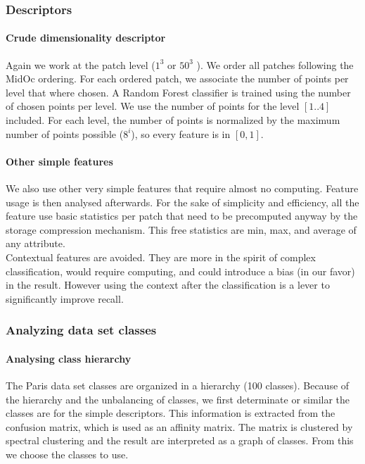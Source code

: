 			
		\subsubsection{Descriptors}  
			\paragraph{Crude dimensionality descriptor}
				Again we work at the patch level ($1^3$ or $50^3$ \cubic \meter).
				We order all patches following the MidOc ordering. For each ordered patch, we associate the number of points per level that where chosen.
				A Random Forest classifier is trained using the number of chosen points per level.
				We use the number of points for the level $[1..4]$ included. For each level, the number of points is normalized by the maximum number of points possible ($8^i$), so every feature is in $[0,1]$.
			
			\paragraph{Other simple features}
				We also use other very simple features that require almost no computing. Feature usage is then analysed afterwards.
				For the sake of simplicity and efficiency, all the feature use basic statistics per patch that need to be precomputed anyway by the storage compression mechanism. This free statistics are min, max, and average of any attribute.
				\\
				Contextual features are avoided. They are more in the spirit of complex classification, would require computing, and could introduce a bias (in our favor) in the result.
				However using the context after the classification is a lever to significantly improve recall.
		
		\subsubsection{Analyzing data set classes}
			\paragraph{Analysing class hierarchy} 
				The Paris data set classes are organized in a hierarchy (100 classes). 
				Because of the hierarchy and the unbalancing of classes, we first determinate or similar the classes are for the simple descriptors. This information is extracted from the confusion matrix, which is used as an affinity matrix. The matrix is clustered by spectral clustering and the result are interpreted as a graph of classes.
				From this we choose the classes to use.
				
